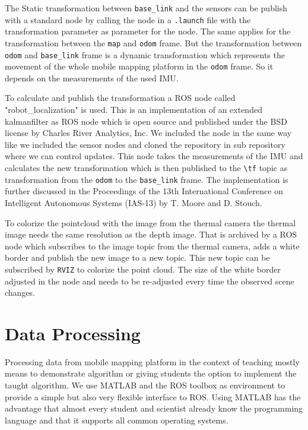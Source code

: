 The Static transformation between \texttt{base\_link} and the sensors can be publish with a standard node by calling the node in a \texttt{.launch} file with the transformation parameter as parameter for the node.
The same applies for the transformation between the \texttt{map} and \texttt{odom} frame.
But the transformation between \texttt{odom} and \texttt{base\_link} frame is a dynamic transformation which represents the movement of the whole mobile mapping platform in the \texttt{odom} frame.
So it depends on the measurements of the used IMU\@.

To calculate and publish the transformation a ROS node called "robot\_localization" is used.
This is an implementation of an extended kalmanfilter as ROS node which is open source and published under the BSD license by Charles River Analytics, Inc.
We included the node in the same way like we included the sensor nodes and cloned the repository in sub repository where we can control updates.
This node takes the measurements of the IMU and calculates the new transformation which is then published to the \texttt{\textbackslash tf} topic as transformation from the \texttt{odom} to the \texttt{base\_link} frame.
The implementation is further discussed in the Proceedings of the 13th International Conference on Intelligent Autonomous Systems (IAS-13) by T. Moore and D. Stouch\cite{MooreStouchKeneralizedEkf2014}.

To colorize the pointcloud with the image from the thermal camera the thermal image needs the same resolution as the depth image.
That is archived by a ROS node which subscribes to the image topic from the thermal camera, adds a white border and publish the new image to a new topic.
This new topic can be subscribed by \texttt{RVIZ} to colorize the point cloud.
The size of the white border adjusted in the node and needs to be re-adjusted every time the observed scene changes.

\section{Data Processing}\label{ch:realization:sec:dataProcessing}

Processing data from mobile mapping platform in the context of teaching mostly means to demonstrate algorithm or giving students the option to implement the taught algorithm.
We use MATLAB and the ROS toolbox as environment to provide a simple but also very flexible interface to ROS.
Using MATLAB has the advantage that almost every student and scientist already know the programming language and that it supports all common operating systems.

